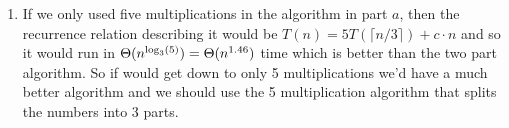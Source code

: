 \documentclass{article}
\begin{document}
\begin{enumerate}
\begin{enumerate}
		\item If we only used five multiplications in the algorithm in part $a$, then the recurrence relation describing it would be  $T(n) = 5T(\lceil n/3 \rceil) + c\cdot n$ and so it would run in $\Theta(n^{\textup{log}_3(5)}) = \Theta(n^{1.46})$ time which is better than the two part algorithm. So if would get down to only 5 multiplications we'd have a much better algorithm and we should use the 5 multiplication algorithm that splits the numbers into 3 parts.  
	\end{enumerate}
\end{enumerate}
\end{document}
